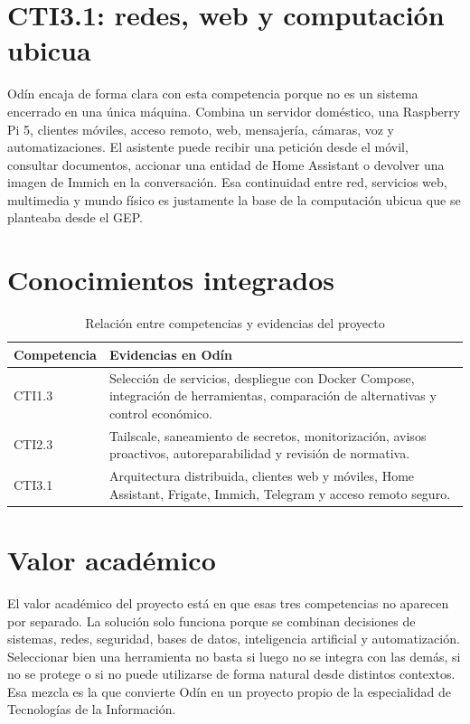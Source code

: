 \section{CTI3.1: redes, web y computación ubicua}
Odín encaja de forma clara con esta competencia porque no es un sistema encerrado en una única máquina. Combina un servidor doméstico, una Raspberry Pi 5, clientes móviles, acceso remoto, web, mensajería, cámaras, voz y automatizaciones. El asistente puede recibir una petición desde el móvil, consultar documentos, accionar una entidad de Home Assistant o devolver una imagen de Immich en la conversación. Esa continuidad entre red, servicios web, multimedia y mundo físico es justamente la base de la computación ubicua que se planteaba desde el GEP.

\section{Conocimientos integrados}
\begin{table}[H]
  \centering
  \caption{Relación entre competencias y evidencias del proyecto}
  \label{tab:competencias-evidencias}
  \begin{tabularx}{\textwidth}{lX}
    \toprule
    Competencia & Evidencias en Odín \\
    \midrule
    CTI1.3 & Selección de servicios, despliegue con Docker Compose, integración de herramientas, comparación de alternativas y control económico. \\
    CTI2.3 & Tailscale, saneamiento de secretos, monitorización, avisos proactivos, autoreparabilidad y revisión de normativa. \\
    CTI3.1 & Arquitectura distribuida, clientes web y móviles, Home Assistant, Frigate, Immich, Telegram y acceso remoto seguro. \\
    \bottomrule
  \end{tabularx}
\end{table}

\section{Valor académico}
El valor académico del proyecto está en que esas tres competencias no aparecen por separado. La solución solo funciona porque se combinan decisiones de sistemas, redes, seguridad, bases de datos, inteligencia artificial y automatización. Seleccionar bien una herramienta no basta si luego no se integra con las demás, si no se protege o si no puede utilizarse de forma natural desde distintos contextos. Esa mezcla es la que convierte Odín en un proyecto propio de la especialidad de Tecnologías de la Información.
